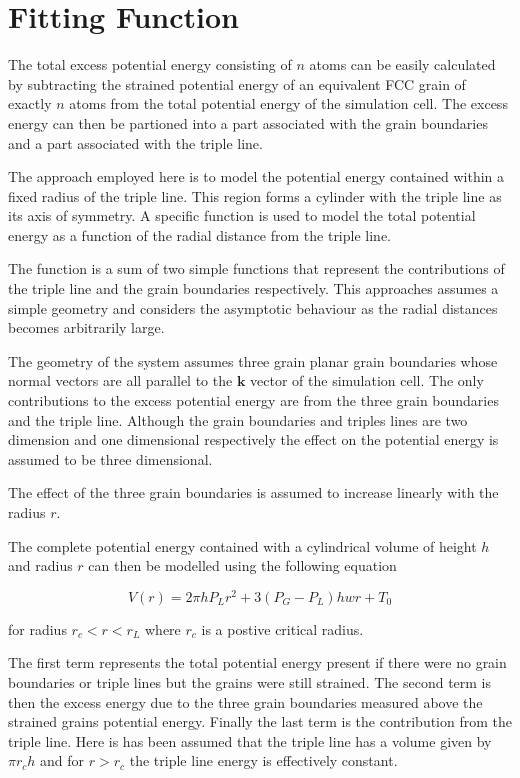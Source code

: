 \documentclass[12pt,a4paper]{book}
\begin{document}
\section{Fitting Function}

The total excess potential energy consisting of $n$ atoms can be easily calculated by subtracting the strained potential energy of an equivalent FCC grain of exactly $n$ atoms from the total potential energy of the simulation cell. The excess energy can then be partioned into a part associated with the grain boundaries and a part associated with the triple line.

The approach employed here is to model the potential energy contained within a fixed radius of the triple line. This region forms a cylinder with the triple line as its axis of symmetry. A specific function is used to model the total potential energy as a function of the radial distance from the triple line. 

The function is a sum of two simple functions that represent the contributions of the triple line and the grain boundaries respectively. This approaches assumes a simple geometry and considers the asymptotic behaviour as the radial distances becomes arbitrarily large.

The geometry of the system assumes three grain planar grain boundaries whose normal vectors are all parallel to the $\mathbf{k}$ vector of the simulation cell. The only contributions to the excess potential energy are from the three grain boundaries and the triple line. Although the grain boundaries and triples lines are two dimension and one dimensional respectively the effect on the potential energy is assumed to be three dimensional.

The effect of the three grain boundaries is assumed to increase linearly with the radius $r$. 


The complete potential energy contained with a cylindrical volume of height $h$ and radius $r$ can then be modelled using the following equation

\[ V(r) = 2 \pi h P_{L} r^2 + 3(P_G-P_L)h w r + T_0  
\]

for radius $r_c < r < r_L$ where $r_c$ is a postive critical radius.

The first term represents the total potential energy present if there were no grain boundaries or triple lines but the grains were still strained. The second term is then the excess energy due to the three grain boundaries measured above the strained grains potential energy. Finally the last term is the contribution from the triple line. Here is has been assumed that the triple line has a volume given by $\pi r_c h$ and for $r > r_c$ the triple line energy is effectively constant.
\end{document}
